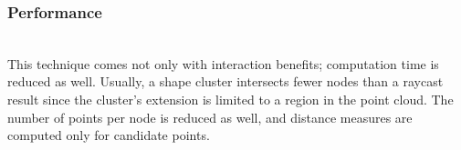 \subsubsection{Performance}
\\
This technique comes not only with interaction benefits; computation time is reduced as well. Usually, a shape cluster intersects fewer nodes than a raycast result since the cluster's extension is limited to a region in the point cloud. The number of points per node is reduced as well, and distance measures are computed only for candidate points. 
\\
\begin{figure}
\centering
{}\par\medskip
{}\par\medskip        
{}
\end{figure}
